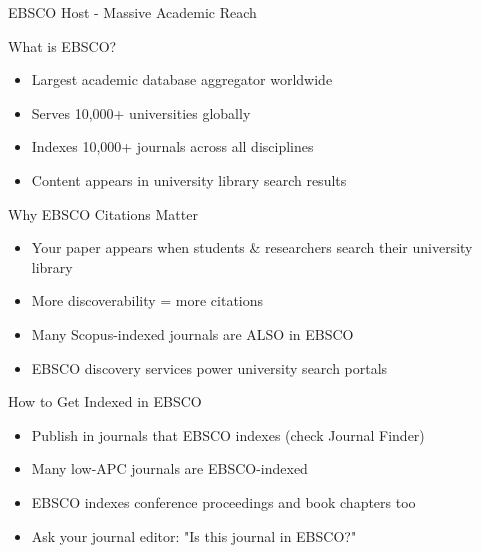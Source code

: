 \documentclass[11pt]{beamer}
\begin{document}
	\begin{frame}{EBSCO Host - Massive Academic Reach}
		\scriptsize
		\begin{block}{What is EBSCO?}
			\begin{itemize}
				\item Largest academic database aggregator worldwide
				\item Serves 10,000+ universities globally
				\item Indexes 10,000+ journals across all disciplines
				\item Content appears in university library search results
			\end{itemize}
		\end{block}
		\begin{block}{Why EBSCO Citations Matter}
			\begin{itemize}
				\item Your paper appears when students \& researchers search their university library
				\item More discoverability = more citations
				\item Many Scopus-indexed journals are ALSO in EBSCO
				\item EBSCO discovery services power university search portals
			\end{itemize}
		\end{block}
		\begin{block}{How to Get Indexed in EBSCO}
			\begin{itemize}
				\item Publish in journals that EBSCO indexes (check Journal Finder)
				\item Many low-APC journals are EBSCO-indexed
				\item EBSCO indexes conference proceedings and book chapters too
				\item Ask your journal editor: "Is this journal in EBSCO?"
			\end{itemize}
		\end{block}
	\end{frame}
	
\end{document}

